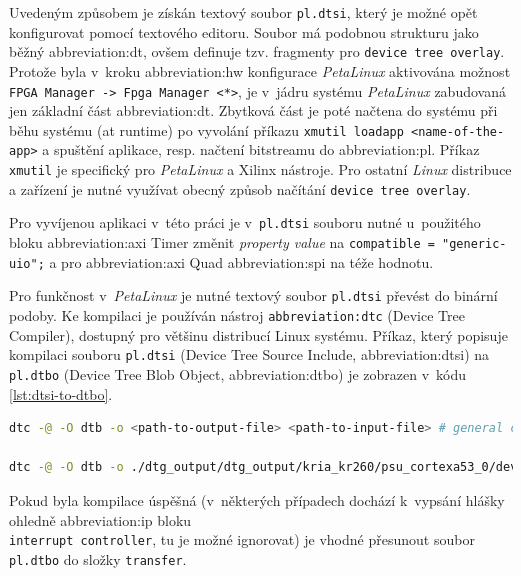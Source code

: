 \documentclass[a4paper, twoside, 11pt]{article}
\begin{document}
		Uvedeným způsobem je získán textový soubor \texttt{pl.dtsi}, který je možné opět konfigurovat pomocí textového editoru. Soubor má podobnou strukturu jako běžný \gls{abbreviation:dt}, ovšem definuje tzv. fragmenty pro \texttt{device tree overlay}. Protože byla v~kroku \gls{abbreviation:hw} konfigurace \textit{PetaLinux} aktivována možnost \texttt{FPGA Manager -> Fpga Manager <*>}, je v~jádru systému \textit{PetaLinux} zabudovaná jen základní část \gls{abbreviation:dt}. Zbytková část je poté načtena do systému při běhu systému (at runtime) po vyvolání příkazu \texttt{xmutil loadapp <name-of-the-app>} a spuštění aplikace, resp. načtení bitstreamu do \gls{abbreviation:pl}. Příkaz \texttt{xmutil} je specifický pro \textit{PetaLinux} a Xilinx nástroje. Pro ostatní \textit{Linux} distribuce a zařízení je nutné využívat obecný způsob načítání \texttt{device tree overlay}.\par
		Pro vyvíjenou aplikaci v~této práci je v~\texttt{pl.dtsi} souboru nutné u~použitého bloku \gls{abbreviation:axi} Timer
		změnit \textit{property value} na \texttt{compatible = "generic-uio";} a pro \gls{abbreviation:axi} Quad \gls{abbreviation:spi} na téže hodnotu.\par
		Pro funkčnost v~\textit{PetaLinux} je nutné textový soubor \texttt{pl.dtsi} převést do binární podoby. Ke kompilaci je používán nástroj \texttt{\gls{abbreviation:dtc}} (Device Tree Compiler), dostupný pro většinu distribucí Linux systému. Příkaz, který popisuje kompilaci souboru \texttt{pl.dtsi} (Device Tree Source Include, \gls{abbreviation:dtsi}) na \texttt{pl.dtbo} (Device Tree Blob Object, \gls{abbreviation:dtbo}) je zobrazen v~kódu \ref{lst:dtsi-to-dtbo}.\par

		\begin{lstlisting}[language={sh}, caption={Kompilace textového souboru device tree overlay pl.dtsi na binární pl.dtbo soubor.}, label= {lst:dtsi-to-dtbo}, morekeywords={dtc}]
dtc -@ -O dtb -o <path-to-output-file> <path-to-input-file> # general command

dtc -@ -O dtb -o ./dtg_output/dtg_output/kria_kr260/psu_cortexa53_0/device_tree_domain/bsp/pl.dtbo ./dtg_output/dtg_output/kria_kr260/psu_cortexa53_0/device_tree_domain/bsp/pl.dtsi # command for project file structure
\end{lstlisting}
	Pokud byla kompilace úspěšná (v~některých případech dochází k~vypsání hlášky ohledně \gls{abbreviation:ip} bloku\\\texttt{interrupt controller}, tu je možné ignorovat) je vhodné přesunout soubor \texttt{pl.dtbo} do složky \texttt{transfer}.
\end{document}
